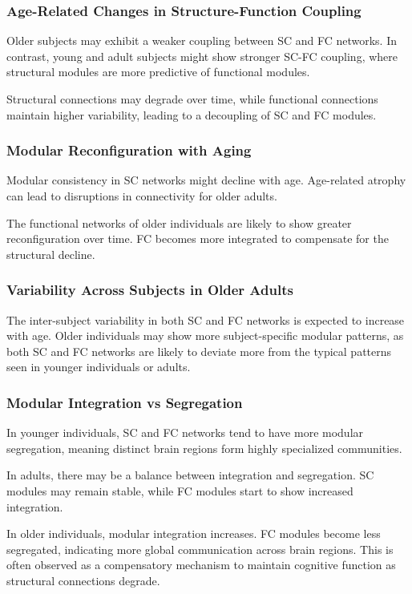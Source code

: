 \subsubsection {Age-Related Changes in Structure-Function Coupling}
Older subjects may exhibit a weaker coupling between SC and FC networks. 
In contrast, young and adult subjects might show stronger SC-FC coupling, 
where structural modules are more predictive of functional modules.

Structural connections may degrade over time, while functional connections maintain 
higher variability, leading to a decoupling of SC and FC modules.

\subsubsection {Modular Reconfiguration with Aging}

Modular consistency in SC networks might decline with age.
Age-related atrophy can lead to disruptions in connectivity for older adults.

The functional networks of older individuals are likely to show greater 
reconfiguration over time. FC becomes more integrated to compensate for the structural decline.


\subsubsection {Variability Across Subjects in Older Adults}
The inter-subject variability in both SC and FC networks is expected to increase with age. 
Older individuals may show more subject-specific modular patterns, as both SC and FC networks 
are likely to deviate more from the typical patterns seen in younger individuals or adults.

\subsubsection{Modular Integration vs Segregation}
In younger individuals, SC and FC networks tend to have more modular segregation, 
meaning distinct brain regions form highly specialized communities. 

In adults, there may be a balance between integration and segregation. 
SC modules may remain stable, while FC modules start to show increased integration.

In older individuals, modular integration increases. FC modules become less segregated, 
indicating more global communication across brain regions. 
This is often observed as a compensatory mechanism to maintain cognitive function as 
structural connections degrade.


\cite{Puxeddu2022}
